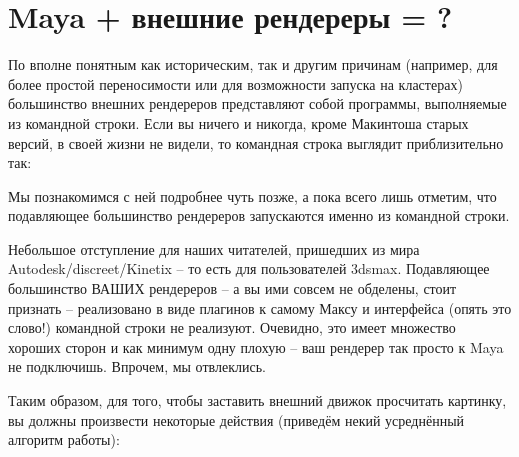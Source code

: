 \chapter*{Maya + внешние рендереры = ?}

 По вполне понятным как историческим, так и другим
    причинам (например, для более простой переносимости или для
    возможности запуска на кластерах) большинство внешних рендереров
    представляют собой программы,  выполняемые из  командной строки. Если вы ничего
    и никогда, кроме Макинтоша старых версий, в своей жизни не видели, то командная
    строка выглядит приблизительно так:

  

 Мы познакомимся с ней подробнее чуть позже, а пока
    всего лишь отметим, что подавляющее большинство рендереров
    запускаются именно из командной строки.
  

 Небольшое отступление для наших читателей,
    пришедших из мира Autodesk/discreet/Kinetix – то есть для пользователей 3dsmax. Подавляющее
    большинство ВАШИХ рендереров – а вы ими совсем не обделены, стоит
    признать – реализовано в виде плагинов к самому Максу и интерфейса
    (опять это слово!) командной строки не реализуют. Очевидно, это
    имеет множество хороших сторон и как минимум одну плохую – ваш
    рендерер так просто к Maya не
    подключишь. Впрочем, мы отвлеклись.
  

 Таким образом, для того, чтобы заставить внешний
    движок просчитать картинку, вы должны произвести некоторые действия
    (приведём некий усреднённый алгоритм работы):
  

